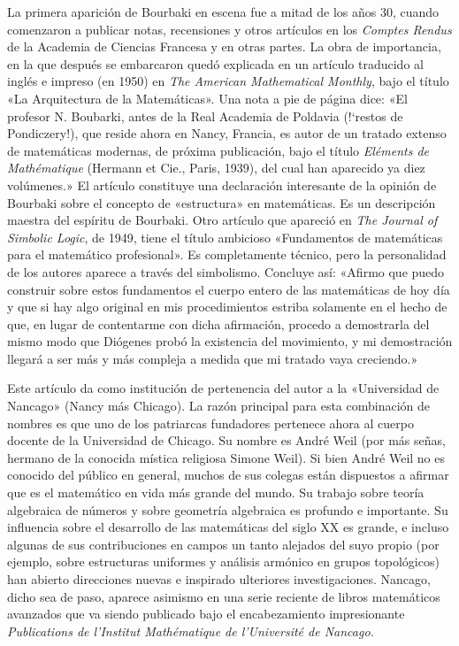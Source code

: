 \documentclass[a4paper, 12pt]{article}
\begin{document}
La primera aparición de Bourbaki en escena fue a mitad de los 
años 30, cuando comenzaron a publicar notas, recensiones y otros 
artículos en los {\it Comptes Rendus} de la Academia de Ciencias Francesa y 
en otras partes. La obra de importancia, en la que después se embarcaron 
quedó explicada en un artículo traducido al inglés e impreso 
(en 1950) en {\it The American Mathematical Monthly}, bajo el título «La 
Arquitectura de la Matemáticas». Una nota a pie de página dice: 
«El profesor N. Boubarki, antes de la Real Academia de Poldavia (!`restos 
de Pondiczery!), que reside ahora en Nancy, Francia, es autor de un tratado 
extenso de matemáticas modernas, de próxima publicación, bajo el 
título {\it Eléments de Mathématique} (Hermann et Cie., Paris, 
1939), del cual han aparecido ya diez volúmenes.» El artículo 
constituye una declaración interesante de la opinión de Bourbaki 
sobre el concepto de «estructura» en matemáticas. Es un 
descripción maestra del espíritu de Bourbaki. Otro artículo 
que apareció en {\it The Journal of Simbolic Logic}, de 1949, tiene el 
título ambicioso «Fundamentos de matemáticas para el 
matemático profesional». Es completamente técnico, pero la 
personalidad de los autores aparece a través del simbolismo. Concluye 
así: «Afirmo que puedo construir sobre estos fundamentos el cuerpo 
entero de las matemáticas de hoy día y que si hay algo original en 
mis procedimientos estriba solamente en el hecho de que, en lugar de 
contentarme con dicha afirmación, procedo a demostrarla del mismo modo 
que Diógenes probó la existencia del movimiento, y mi 
demostración llegará a ser más y más compleja a medida que 
mi tratado vaya creciendo.» 

Este artículo da como institución de pertenencia del autor a la 
«Univer\-sidad de Nan\-cago» (Nancy más Chicago). La razón principal 
para esta combinación de nombres es que uno de los patriarcas fundadores 
pertenece ahora al cuerpo docente de la Universidad de Chicago. Su nombre es 
André Weil (por más señas, hermano de la conocida mística 
religiosa Simone Weil). Si bien André Weil no es conocido del 
público en general, muchos de sus colegas están dispuestos a afirmar 
que es el matemático en vida más grande del mundo. Su trabajo sobre 
teoría algebraica de números y sobre geometría algebraica es 
profundo e importante. Su influencia sobre el desarrollo de las 
matemáticas del siglo XX es grande, e incluso algunas de sus 
contribuciones en campos un tanto alejados del suyo propio (por ejemplo, 
sobre estructuras uniformes y análisis armónico en grupos 
topológicos) han abierto direcciones nuevas e inspirado ulteriores 
investigaciones. Nancago, dicho sea de paso, aparece asimismo en una serie 
reciente de libros matemáticos avanzados que va siendo publicado bajo el 
encabezamiento impresionante {\it Publications de l'Institut Mathématique de 
l'Université de Nancago.} 
\end{document}
